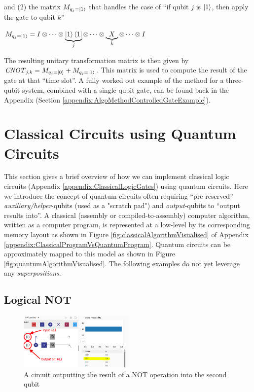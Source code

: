 \documentclass[conference]{IEEEtran}
\begin{document}
and
(2) the matrix $M_{q_{j}=\ket{1}}$ that handles the case of ``if qubit $j$ is $\ket{1}$, then apply the gate to qubit $k$''
\begin{center}
$
M_{q_{j}=\ket{1}}
=
I \otimes \dots
\otimes \underbrace{\ket{1}\bra{1}}_{j}
\otimes \dots
\otimes \underbrace{X}_{k}
\otimes
\dots \otimes I
$
\end{center}

The resulting unitary transformation matrix is then given by $\text{\textit{CNOT}}_{j,k} = M_{q_{j}=\ket{0}} + M_{q_{j}=\ket{1}}$.
This matrix is used to compute the result of the gate at that ``time slot''.
A fully worked out example of the method for a three-qubit system, combined with a single-qubit gate, can be found back in the
Appendix (Section \ref{appendix:AlgoMethodControlledGateExample}).


\section{Classical Circuits using Quantum Circuits}
\label{sec:ClassicalCircuitsUsingQuantum}

This section gives a brief overview of how we can implement
classical logic circuits (Appendix \ref{appendix:ClassicalLogicGates}) using quantum circuits.
Here we introduce the concept of quantum circuits often requiring ``pre-reserved'' \textit{auxiliary/helper}-qubits
(used as a "scratch pad") and \textit{output}-qubits to ``output results into''.
A classical (assembly or compiled-to-assembly) computer algorithm, written as a computer program,
is represented at a low-level by its corresponding memory layout as shown in Figure \ref{fig:classicalAlgorithmVisualised} of Appendix \ref{appendix:ClassicalProgramVsQuantumProgram}.
Quantum circuits can be approximately mapped to this model as shown in
Figure \ref{fig:quantumAlgorithmVisualised}.
The following examples do not yet leverage any \textit{superpositions}.


\subsection{Logical NOT}

\begin{figure}[tbp]
    \centerline{
        \includegraphics[width=0.5\textwidth]{img/circuit_not_auxiliary.png}
    }
    \caption{A circuit outputting the result of a NOT operation into the second qubit}
    \label{fig:circuitNotAuxiliary}
\end{figure}
\end{document}
